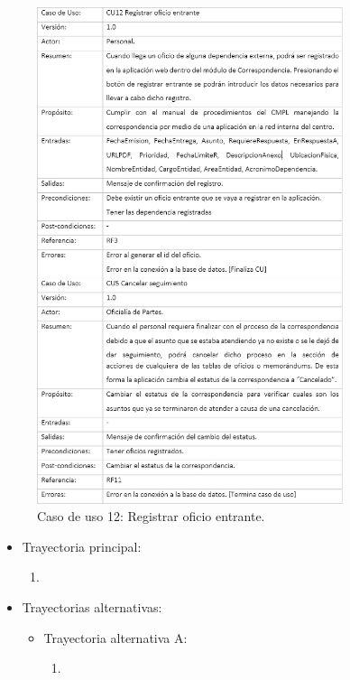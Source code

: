 	\begin{figure}[htbp!]
		\centering
			\includegraphics[width=0.8\textwidth]{images/CU/CU12}
		\caption{Caso de uso 12: Registrar oficio entrante.}
		\label{Tabla}
	\end{figure}
	
\begin{itemize}
	\item Trayectoria principal:
	\begin{enumerate}
		\item 
	\end{enumerate}
	
	\item Trayectorias alternativas:
	\begin{itemize}
		\item Trayectoria alternativa A:
			\begin{enumerate}
				\item 
			\end{enumerate}
	\end{itemize}
\end{itemize}

